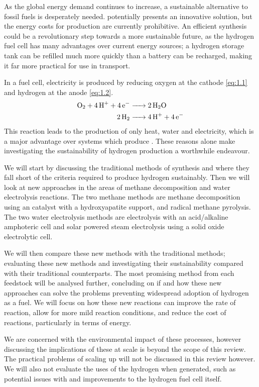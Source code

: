 As the global energy demand continues to increase, a sustainable alternative to fossil fuels is desperately needed.
 potentially presents an innovative solution, but the energy costs for production are currently prohibitive.
An efficient synthesis could be a revolutionary step towards a more sustainable future, as the hydrogen fuel cell has many advantages over current energy sources; a hydrogen storage tank can be refilled much more quickly than a battery can be recharged, \cite{Offer2010} making it far more practical for use in transport.

In a fuel cell, electricity is produced by reducing oxygen at the cathode \eqref{eq:1.1} and hydrogen at the anode \eqref{eq:1.2}.
\begin{align}
	\ce{O2 + 4H+ + 4e- &-> 2H2O}	\label{eq:1.1}\\
	\ce{2H2 &-> 4H+ + 4e-} 		\label{eq:1.2}
\end{align}
This reaction leads to the production of only heat, water and electricity, \cite{6278114} which is a major advantage over systems which produce .
These reasons alone make investigating the sustainability of hydrogen production a worthwhile endeavour.

We will start by discussing the traditional methods of synthesis and where they fall short of the criteria required to produce hydrogen sustainably.
\cite{Saxena2011} Then we will look at new approaches in the areas of methane decomposition and water electrolysis reactions.
The two methane methods are methane decomposition using an  catalyst with a hydroxyapatite support, and radical methane pyrolysis.
The two water electrolysis methods are electrolysis with an acid/alkaline amphoteric cell and solar powered steam electrolysis using a solid oxide electrolytic cell.

We will then compare these new methods with the traditional methods; evaluating these new methods and investigating their sustainability compared with their traditional counterparts.
The most promising method from each feedstock will be analysed further, concluding on if and how these new approaches can solve the problems preventing widespread adoption of hydrogen as a fuel.
We will focus on how these new reactions can improve the rate of reaction, allow for more mild reaction conditions, and reduce the cost of reactions, particularly in terms of energy.

We are concerned with the environmental impact of these processes, however discussing the implications of these at scale is beyond the scope of this review.
The practical problems of scaling up will not be discussed in this review however.
We will also not evaluate the uses of the hydrogen when generated, such as potential issues with and improvements to the hydrogen fuel cell itself.


